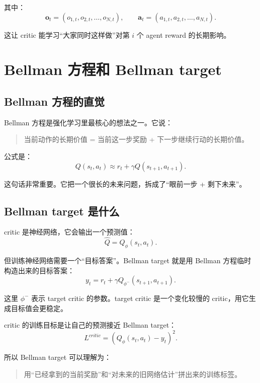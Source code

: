 \documentclass[UTF8,zihao=-4]{ctexart}
\begin{document}
其中：
\begin{equation}
\bm{o}_t=(o_{1,t},o_{2,t},\dots,o_{N,t}),
\qquad
\bm{a}_t=(a_{1,t},a_{2,t},\dots,a_{N,t}).
\end{equation}

这让 critic 能学习“大家同时这样做”对第 $i$ 个 agent reward 的长期影响。

\section{Bellman 方程和 Bellman target}

\subsection{Bellman 方程的直觉}

Bellman 方程是强化学习里最核心的想法之一。它说：
\begin{quote}
当前动作的长期价值 = 当前这一步奖励 + 下一步继续行动的长期价值。
\end{quote}

公式是：
\begin{equation}
Q(s_t,a_t)
\approx
r_t+\gamma Q(s_{t+1},a_{t+1}).
\end{equation}

这句话非常重要。它把一个很长的未来问题，拆成了“眼前一步 + 剩下未来”。

\subsection{Bellman target 是什么}

critic 是神经网络，它会输出一个预测值：
\begin{equation}
\hat Q=Q_\phi(s_t,a_t).
\end{equation}

但训练神经网络需要一个“目标答案”。Bellman target 就是用 Bellman 方程临时构造出来的目标答案：
\begin{equation}
y_t=r_t+\gamma Q_{\phi^-}(s_{t+1},a_{t+1}).
\end{equation}

这里 $\phi^-$ 表示 target critic 的参数。target critic 是一个变化较慢的 critic，用它生成目标值会更稳定。

critic 的训练目标是让自己的预测接近 Bellman target：
\begin{equation}
L^{critic}
=
\left(
Q_\phi(s_t,a_t)-y_t
\right)^2.
\end{equation}

所以 Bellman target 可以理解为：
\begin{quote}
用“已经拿到的当前奖励”和“对未来的旧网络估计”拼出来的训练标签。
\end{quote}
\end{document}

